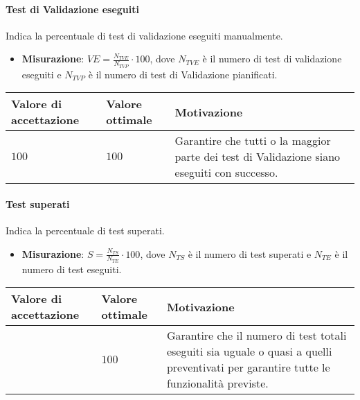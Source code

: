 \paragraph{Test di Validazione eseguiti}
Indica la percentuale di test di validazione eseguiti manualmente.
\begin{itemize}
\item \textbf{Misurazione}: $VE=\frac{N_{TVE}}{N_{TVP}} \cdot 100$, dove $N_{TVE}$ è il numero di test di validazione eseguiti e $N_{TVP}$ è il numero di test di Validazione pianificati.
\end{itemize}

\begin{center}
		\begin{tabular}{|P{2.5cm}|P{2.5cm}|P{6cm}|}
		\hline
			\textbf{Valore di accettazione}	& \textbf{Valore ottimale} & \textbf{Motivazione} \\
			\hline
			$100$ & $100$ &	Garantire che tutti o la maggior parte dei test di Validazione siano eseguiti con successo. \\
			\hline
			\end{tabular}
\end{center}

\paragraph{Test superati}
Indica la percentuale di test superati.
\begin{itemize}
\item \textbf{Misurazione}: $S=\frac{N_{TS}}{N_{TE}} \cdot 100$, dove $N_{TS}$ è il numero di test superati e $N_{TE}$ è il numero di test eseguiti.
\end{itemize}

\begin{center}
		\begin{tabular}{|P{2.5cm}|P{2.5cm}|P{6cm}|}
		\hline
			\textbf{Valore di accettazione}	& \textbf{Valore ottimale} & \textbf{Motivazione} \\
			\hline
			[$90 - 100$] & $100$ &	Garantire che il numero di test totali eseguiti sia uguale o quasi a quelli preventivati per garantire tutte le funzionalità previste. \\
			\hline
			\end{tabular}
\end{center}



